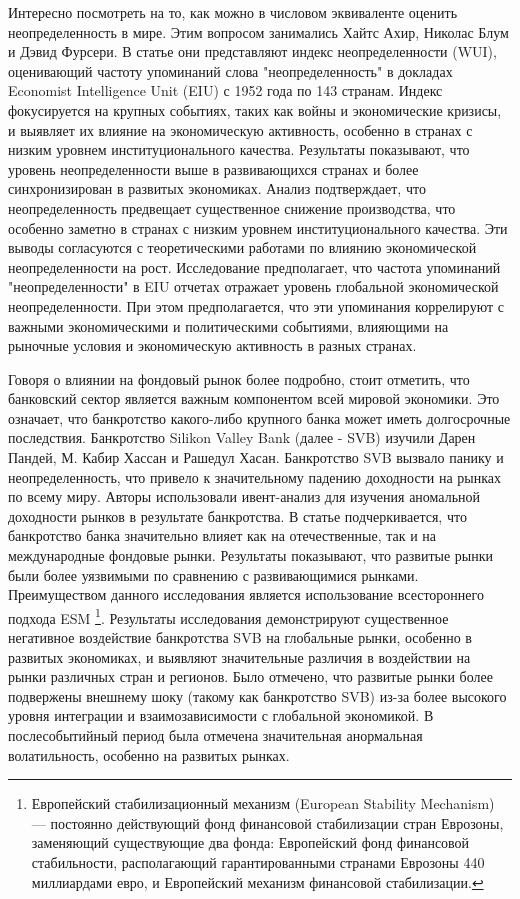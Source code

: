 \documentclass[14pt]{extarticle}
\begin{document}
Интересно посмотреть на то, как можно в числовом эквиваленте оценить неопределенность в мире. Этим вопросом занимались Хайтс Ахир, Николас Блум и Дэвид Фурсери\cite{NBERw29763}. В статье они представляют индекс неопределенности (WUI), оценивающий частоту упоминаний слова "неопределенность" в докладах Economist Intelligence Unit (EIU) с 1952 года по 143 странам. Индекс фокусируется на крупных событиях, таких как войны и экономические кризисы, и выявляет их влияние на экономическую активность, особенно в странах с низким уровнем институционального качества. Результаты показывают, что уровень неопределенности выше в развивающихся странах и более синхронизирован в развитых экономиках. Анализ подтверждает, что неопределенность предвещает существенное снижение производства, что особенно заметно в странах с низким уровнем институционального качества. Эти выводы согласуются с теоретическими работами по влиянию экономической неопределенности на рост. Исследование предполагает, что частота упоминаний "неопределенности" в EIU отчетах отражает уровень глобальной экономической неопределенности. При этом предполагается, что эти упоминания коррелируют с важными экономическими и политическими событиями, влияющими на рыночные условия и экономическую активность в разных странах.

Говоря о влиянии на фондовый рынок более подробно, стоит отметить, что банковский сектор является важным компонентом всей мировой экономики. Это означает, что банкротство какого-либо крупного банка может иметь долгосрочные последствия. Банкротство Silikon Valley Bank (далее - SVB)\cite{PANDEY2023104013} изучили Дарен Пандей, М. Кабир Хассан и Рашедул Хасан. Банкротство SVB вызвало панику и неопределенность, что привело к значительному падению доходности на рынках по всему миру. Авторы использовали ивент-анализ для изучения аномальной доходности рынков в результате банкротства. В статье подчеркивается, что банкротство банка значительно влияет как на отечественные, так и на международные фондовые рынки. Результаты показывают, что развитые рынки были более уязвимыми по сравнению с развивающимися рынками. Преимуществом данного исследования является использование всестороннего подхода ESM \footnote{Европейский стабилизационный механизм (European Stability Mechanism) — постоянно действующий фонд финансовой стабилизации стран Еврозоны, заменяющий существующие два фонда: Европейский фонд финансовой стабильности, располагающий гарантированными странами Еврозоны 440 миллиардами евро, и Европейский механизм финансовой стабилизации.}.
Результаты исследования демонстрируют существенное негативное воздействие банкротства SVB на глобальные рынки, особенно в развитых экономиках, и выявляют значительные различия в воздействии на рынки различных стран и регионов. Было отмечено, что развитые рынки более подвержены внешнему шоку (такому как банкротство SVB) из-за более высокого уровня интеграции и взаимозависимости с глобальной экономикой. В послесобытийный период была отмечена значительная анормальная волатильность, особенно на развитых рынках.
\end{document}
